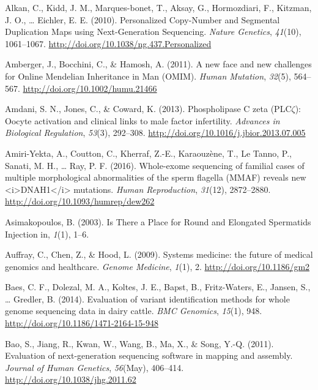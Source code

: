 \documentclass[12pt,twoside]{reedthesis}
\theoremstyle{definition}
\theoremstyle{definition}
\theoremstyle{remark}
\begin{document}
  \hypertarget{ref-Alkan2010}{}
  Alkan, C., Kidd, J. M., Marques-bonet, T., Aksay, G., Hormozdiari, F.,
  Kitzman, J. O., \ldots{} Eichler, E. E. (2010). Personalized Copy-Number
  and Segmental Duplication Maps using Next-Generation Sequencing.
  \emph{Nature Genetics}, \emph{41}(10), 1061--1067.
  \url{http://doi.org/10.1038/ng.437.Personalized}
  
  \hypertarget{ref-Amberger2011}{}
  Amberger, J., Bocchini, C., \& Hamosh, A. (2011). A new face and new
  challenges for Online Mendelian Inheritance in Man (OMIM). \emph{Human
  Mutation}, \emph{32}(5), 564--567.
  \url{http://doi.org/10.1002/humu.21466}
  
  \hypertarget{ref-Amdani2013}{}
  Amdani, S. N., Jones, C., \& Coward, K. (2013). Phospholipase C zeta
  (PLC\(\zeta\)): Oocyte activation and clinical links to male factor
  infertility. \emph{Advances in Biological Regulation}, \emph{53}(3),
  292--308. \url{http://doi.org/10.1016/j.jbior.2013.07.005}
  
  \hypertarget{ref-Amiri-Yekta2016}{}
  Amiri-Yekta, A., Coutton, C., Kherraf, Z.-E., Karaouzène, T., Le Tanno,
  P., Sanati, M. H., \ldots{} Ray, P. F. (2016). Whole-exome sequencing of
  familial cases of multiple morphological abnormalities of the sperm
  flagella (MMAF) reveals new
  \textless{}i\textgreater{}DNAH1\textless{}/i\textgreater{} mutations.
  \emph{Human Reproduction}, \emph{31}(12), 2872--2880.
  \url{http://doi.org/10.1093/humrep/dew262}
  
  \hypertarget{ref-Asimakopoulos2003}{}
  Asimakopoulos, B. (2003). Is There a Place for Round and Elongated
  Spermatids Injection in, \emph{1}(1), 1--6.
  
  \hypertarget{ref-Auffray2009}{}
  Auffray, C., Chen, Z., \& Hood, L. (2009). Systems medicine: the future
  of medical genomics and healthcare. \emph{Genome Medicine}, \emph{1}(1),
  2. \url{http://doi.org/10.1186/gm2}
  
  \hypertarget{ref-Baes2014}{}
  Baes, C. F., Dolezal, M. A., Koltes, J. E., Bapst, B., Fritz-Waters, E.,
  Jansen, S., \ldots{} Gredler, B. (2014). Evaluation of variant
  identification methods for whole genome sequencing data in dairy cattle.
  \emph{BMC Genomics}, \emph{15}(1), 948.
  \url{http://doi.org/10.1186/1471-2164-15-948}
  
  \hypertarget{ref-Bao2011}{}
  Bao, S., Jiang, R., Kwan, W., Wang, B., Ma, X., \& Song, Y.-Q. (2011).
  Evaluation of next-generation sequencing software in mapping and
  assembly. \emph{Journal of Human Genetics}, \emph{56}(May), 406--414.
  \url{http://doi.org/10.1038/jhg.2011.62}
  
\end{document}
